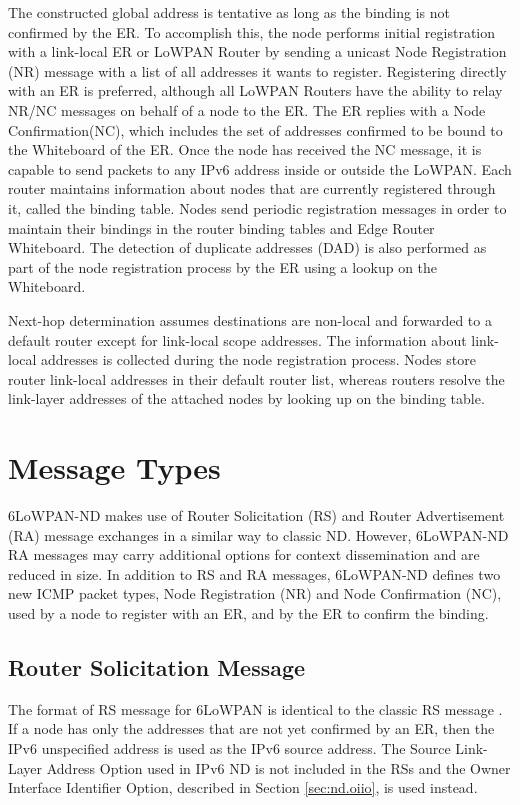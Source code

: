 The constructed global address is tentative as long as the binding is not confirmed by the ER. To accomplish this, the node performs initial registration with a link-local ER  or LoWPAN Router by sending a unicast Node Registration (NR) message with a list of all addresses it wants to register. Registering directly with an ER is preferred, although all LoWPAN Routers have the ability to relay NR/NC messages on behalf of a node to the ER. The ER replies with a Node Confirmation(NC), which includes the set of addresses confirmed to be bound to the Whiteboard of the ER. Once the node has received the NC message, it is capable to send packets to any IPv6 address inside or outside the LoWPAN. Each router maintains information about nodes that are currently registered through it, called the binding table. Nodes send periodic registration messages in order to maintain their bindings in the router binding tables and Edge Router Whiteboard. The detection of duplicate addresses (DAD) is also performed as part of the node registration process by the ER using a lookup on the Whiteboard. 

Next-hop determination assumes destinations are non-local and forwarded to a default router except for link-local scope addresses. The information about link-local addresses is collected during the node registration process. Nodes store router link-local addresses in their default router list, whereas routers resolve the link-layer addresses of the attached nodes by looking up on the binding table. 

\section{Message Types}

6LoWPAN-ND makes use of Router Solicitation (RS) and Router Advertisement (RA) message exchanges in a similar way to classic ND. However, 6LoWPAN-ND RA messages may carry additional options for context dissemination and are reduced in size. In addition to RS and RA messages, 6LoWPAN-ND defines two new ICMP packet types, Node Registration (NR) and Node Confirmation (NC), used by a node to register with an ER, and by the ER to confirm the
binding. 

\subsection{Router Solicitation Message}
The format of RS message for 6LoWPAN is identical to the classic RS message \cite{rfc4861}. If a node has only the addresses that are not yet confirmed by an ER, then the IPv6 unspecified address is used as the IPv6 source address. The Source Link-Layer Address Option \cite{rfc4861} used in IPv6 ND is not included in the RSs and the Owner Interface Identifier Option, described in Section \ref{sec:nd.oiio}, is used instead.

